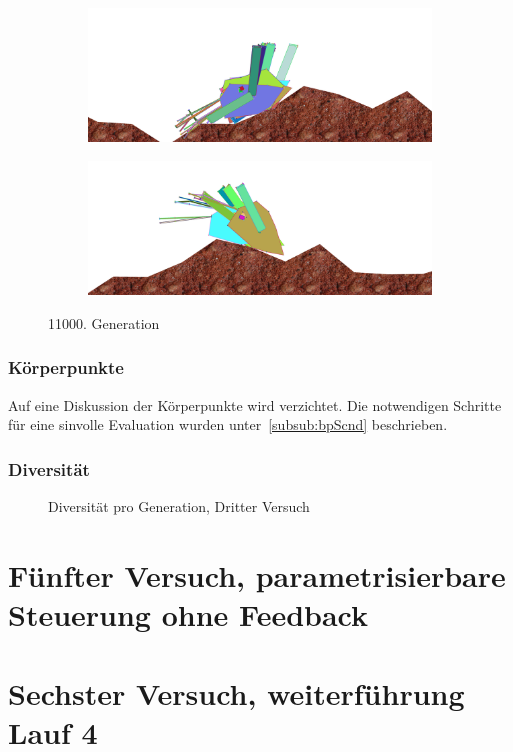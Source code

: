 \begin{figure}[H]
\begin{subfigure}[b]{0.45\textwidth}
              \includegraphics[width=\linewidth,center]{graphics/simulation-results/4_gen11000_3}
              \caption{\label{fig:gen11000_3}}
            \end{subfigure}
            \begin{subfigure}[b]{0.45\textwidth}
              \includegraphics[width=\linewidth,center]{graphics/simulation-results/4_gen11000_4}
              \caption{\label{fig:gen11000_4}}
            \end{subfigure}
            \caption{11000. Generation \label{fig:gen11000}}
          \end{figure}

          \subsubsection{Körperpunkte}

            Auf eine Diskussion der Körperpunkte wird verzichtet.
            Die notwendigen Schritte für eine sinvolle Evaluation wurden unter~\vref{subsub:bpScnd} beschrieben.

          \subsubsection{Diversität}

            \begin{figure}[H]
              \centering
              
              \caption{Diversität pro Generation, Dritter Versuch\label{fig:graphDivFourth}}
            \end{figure}

    \section{Fünfter Versuch, parametrisierbare Steuerung ohne Feedback}

    \section{Sechster Versuch, weiterführung Lauf 4 \label{sec:sixthSimulation}}
